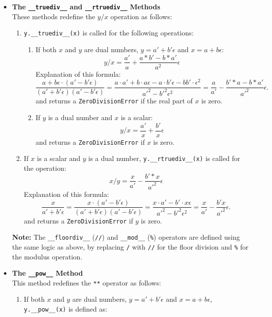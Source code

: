 \documentclass[a4paper,12pt]{article}
\begin{document}
\begin{itemize}
    \item \textbf{The \texttt{\_\_truediv\_\_} and \texttt{\_\_rtruediv\_\_} Methods} \\
    These methods redefine the \(y / x\) operation as follows:
     \begin{enumerate}
        \item \texttt{y.\_\_truediv\_\_(x)} is called for the following operations:
    \begin{enumerate}
        \item If both \(x\) and \(y\) are dual numbers, \(y = a' + b'\epsilon\) and \(x = a + b\epsilon\):
        \[
        y / x = \frac{a'}{a} + \frac{a*b' - b*a'}{a^2}\epsilon
        \]
        Explanation of this formula: 
        \[
		\frac{a + b \epsilon \cdot (a' - b' \epsilon)}{(a' + b' \epsilon)(a' - b' \epsilon)} =
		 \frac{a \cdot a' + b \cdot a \epsilon - a \cdot b' \epsilon - b b' \cdot \epsilon^2}{a'^2 - b'^2 \epsilon^2} = 
		 \frac{a}{a'} - \frac{b' *a-b*a'}{a'^2} \epsilon.
	\]
        and returns a \texttt{ZeroDivisionError} if the real part of \(x\) is zero.
        \item If \(y\) is a dual number and \(x\) is a scalar:
        \[
        y / x = \frac{a'}{x} + \frac{b'}{x}\epsilon
        \]
        and returns a \texttt{ZeroDivisionError} if \(x\) is zero.
        \end{enumerate}
        \item If \(x\) is a scalar and \(y\) is a dual number, \texttt{y.\_\_rtruediv\_\_(x)} is called for the operation:
        \[
        x / y = \frac{x}{a'} - \frac{b' * x}{a' ^2}\epsilon
        \]
        Explanation of this formula: 
        \[
		\frac{x}{a' + b' \epsilon} = \frac{x \cdot (a' - b' \epsilon)}{(a' + b' \epsilon)(a' - b' \epsilon)} =
		 \frac{x \cdot a' - b' \cdot x \epsilon}{a'^2 - b'^2 \epsilon^2} =\frac{x}{a'} - \frac{b' x}{a'^2} \epsilon.
	\]
        and returns a \texttt{ZeroDivisionError} if \(y\) is zero.
    \end{enumerate}
    \textbf{Note:} The \texttt{\_\_floordiv\_\_} (\texttt{//}) and \texttt{\_\_mod\_\_} (\texttt{\%}) operators are defined using the same logic as above, by replacing \texttt{/} with \texttt{//} for the floor division and \texttt{\%} for the modulus operation.

    \item \textbf{The \texttt{\_\_pow\_\_} Method} \\
    This method redefines the \texttt{**} operator as follows:
    \begin{enumerate}
        \item If both \(x\) and \(y\) are dual numbers, \(y = a' + b'\epsilon\) and \(x = a + b\epsilon\), \texttt{y.\_\_pow\_\_(x)} is defined as:


\end{enumerate}
\end{itemize}
\end{document}
